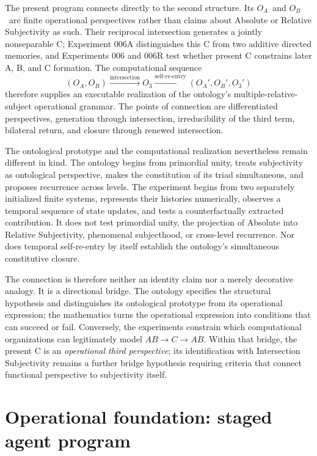 \documentclass[11pt,a4paper]{article}
\newcommand{\OA}{\ensuremath{O_{A}}}
\newcommand{\OB}{\ensuremath{O_{B}}}
\newcommand{\Othree}{\ensuremath{O_{3}}}
\begin{document}
The present program connects directly to the second structure. Its \OA\ and \OB\ are finite operational perspectives rather than claims about Absolute or Relative Subjectivity as such. Their reciprocal intersection generates a jointly nonseparable C; Experiment 006A distinguishes this C from two additive directed memories, and Experiments 006 and 006R test whether present C constrains later A, B, and C formation. The computational sequence
\[
 (\OA,\OB)\xrightarrow{\text{intersection}}\Othree
 \xrightarrow{\text{self-re-entry}}(\OA',\OB',\Othree')
\]
therefore supplies an executable realization of the ontology's multiple-relative-subject operational grammar. The points of connection are differentiated perspectives, generation through intersection, irreducibility of the third term, bilateral return, and closure through renewed intersection.

The ontological prototype and the computational realization nevertheless remain different in kind. The ontology begins from primordial unity, treats subjectivity as ontological perspective, makes the constitution of its triad simultaneous, and proposes recurrence across levels. The experiment begins from two separately initialized finite systems, represents their histories numerically, observes a temporal sequence of state updates, and tests a counterfactually extracted contribution. It does not test primordial unity, the projection of Absolute into Relative Subjectivity, phenomenal subjecthood, or cross-level recurrence. Nor does temporal self-re-entry by itself establish the ontology's simultaneous constitutive closure.

The connection is therefore neither an identity claim nor a merely decorative analogy. It is a directional bridge. The ontology specifies the structural hypothesis and distinguishes its ontological prototype from its operational expression; the mathematics turns the operational expression into conditions that can succeed or fail. Conversely, the experiments constrain which computational organizations can legitimately model $AB\rightarrow C\rightarrow AB$. Within that bridge, the present C is an \emph{operational third perspective}; its identification with Intersection Subjectivity remains a further bridge hypothesis requiring criteria that connect functional perspective to subjectivity itself.

\section{Operational foundation: staged agent program}
\end{document}

